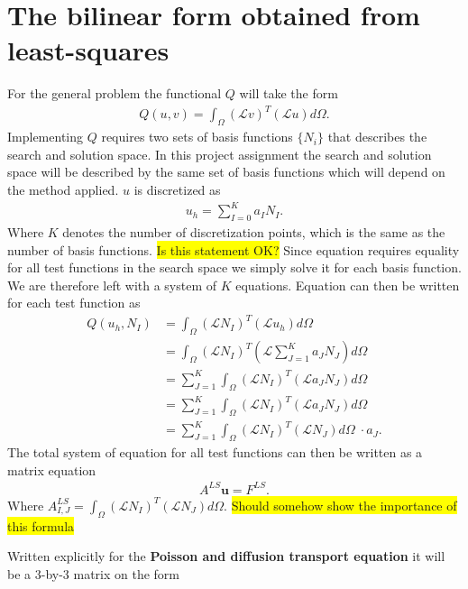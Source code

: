 \section{The bilinear form obtained from least-squares}
 For the general problem the functional $Q$ will take the form 
\begin{align}
	Q(u,v)=\int_{\Omega}(\mathcal{L}v)^T(\mathcal{L}u)d\Omega.
	\label{eq:functionalInt}
\end{align}
Implementing $Q$ requires two sets of basis functions $\{N_i\}$ that describes the search and solution space. In this project assignment the search and solution space will be described by the same set of basis functions which will depend on the method applied. $u$ is discretized as 
\begin{align}
	u_h = \sum_{I=0}^{K}a_IN_I.
	\label{eq:uDisc}
\end{align}
Where $K$ denotes the number of discretization points, which is the same as the number of basis functions. \colorbox{yellow}{Is this statement OK?} Since equation requires equality for all test functions in the search space we simply solve it for each basis function. We are therefore left with a system of $K$ equations. Equation can then be written for each test function as  
\begin{align}
	Q(u_h,N_I) &= \int_{\Omega}(\mathcal{L}N_I)^T(\mathcal{L}u_h)d\Omega \\
	&= \int_{\Omega}(\mathcal{L}N_I)^T(\mathcal{L}\sum_{J=1}^Ka_JN_J)d\Omega \\
	&= \sum_{J=1}^K\int_{\Omega}(\mathcal{L}N_I)^T(\mathcal{L}a_JN_J)d\Omega \\
	&= \sum_{J=1}^K\int_{\Omega}(\mathcal{L}N_I)^T(\mathcal{L}a_JN_J)d\Omega \\
	&= \sum_{J=1}^K\int_{\Omega}(\mathcal{L}N_I)^T(\mathcal{L}N_J)d\Omega \;\cdot a_J.
	\label{eq:varFormDisc}
\end{align}
The total system of equation for all test functions can then be written as a matrix equation 
\begin{align}
	A^{LS}\mathbf{u} = F^{LS}.
	\label{eq:matrixEq}
\end{align}
Where $A^{LS}_{I,J}=\int_{\Omega}(\mathcal{L}N_I)^T(\mathcal{L}N_J)d\Omega$. \colorbox{yellow}{Should somehow show the importance of this formula}

Written explicitly for the \textbf{Poisson and diffusion transport equation} it will be a 3-by-3 matrix on the form 

